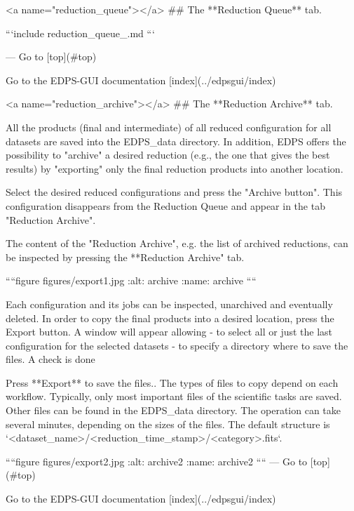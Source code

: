 <a name="reduction_queue"></a>
## The **Reduction Queue** tab.

```{include} reduction_queue_.md
```

---
Go to [top](#top)

Go to the EDPS-GUI documentation [index](../edpsgui/index)


<a name="reduction_archive"></a>
## The **Reduction Archive** tab.

All the products (final and intermediate) of all reduced configuration for all datasets are saved into
the EDPS_data directory. In addition, EDPS offers the possibility to "archive" a desired reduction (e.g., the one
that gives the best results) by "exporting" only the final reduction products into another location.

Select the desired reduced configurations and press the "Archive button". This configuration disappears from the
Reduction Queue and appear in the tab "Reduction Archive".

The content of the "Reduction Archive", e.g. the list of archived reductions, can be inspected by pressing the
**Reduction Archive" tab.

   ````{figure} figures/export1.jpg
   :alt: archive
   :name: archive
   ```` 

Each configuration and its jobs can be inspected, unarchived and eventually deleted.
In order to copy the final products into a desired location, press the Export button. A window will appear
allowing 
 - to select all or just the last configuration for the selected datasets  
 - to specify a directory where to save the files. A check is done 

Press **Export** to save the files.. 
The types of files to copy depend on each workflow. Typically, only most important files of the 
scientific tasks are saved. Other files can be found in the EDPS_data directory.
The operation can take several minutes, depending on the sizes of the files.
The default structure is `<dataset_name>/<reduction_time_stamp>/<category>.fits`.

   ````{figure} figures/export2.jpg
   :alt: archive2
   :name: archive2
   ````  
---
Go to [top](#top)

Go to the EDPS-GUI documentation [index](../edpsgui/index)

